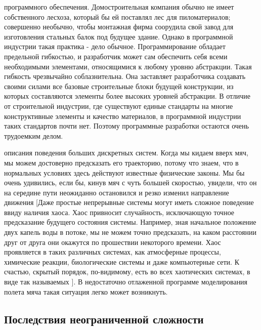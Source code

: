 \documentclass[11pt]{article}
\begin{document}
{ программного обеспечения.} Домостроительная компания обычно не имеет собственного лесхоза, который бы ей поставлял лес для пиломатериалов; совершенно необычно, чтобы монтажная фирма соорудила свой завод для изготовления стальных балок под будущее здание. Однако в программной индустрии такая практика - дело обычное. Программирование обладает предельной гибкостью, и разработчик может сам обеспечить себя всеми необходимыми элементами, относящимися к любому уровню абстракции. Такая гибкость чрезвычайно соблазнительна. Она заставляет разработчика создавать своими силами все базовые строительные блоки будущей конструкции, из которых составляются элементы более высоких уровней абстракции. В отличие от строительной индустрии, где существуют единые стандарты на многие конструктивные элементы и качество материалов, в программной индустрии таких стандартов почти нет. Поэтому программные разработки остаются очень трудоемким делом.
\par
{ описания поведения больших дискретных систем.} Когда мы кидаем вверх мяч, мы можем достоверно предсказать его траекторию, потому что знаем, что в нормальных условиях здесь действуют известные физические законы. Мы бы очень удивились, если бы, кинув мяч с чуть большей скоростью, увидели, что он на середине пути неожиданно остановился и резко изменил направление движения [Даже простые непрерывные системы могут иметь сложное поведение ввиду наличия хаоса. Хаос привносит случайность, исключающую точное предсказание будущего состояния системы. Например, зная начальное положение двух капель воды в потоке, мы не можем точно предсказать, на каком расстоянии друг от друга они окажутся по прошествии некоторого времени. Хаос проявляется в таких различных системах, как атмосферные процессы, химические реакции, биологические системы и даже компьютерные сети. К счастью, скрытый порядок, по-видимому, есть во всех хаотических системах, в виде так называемых {}]. В недостаточно отлаженной программе моделирования полета мяча такая ситуация легко может возникнуть.
\parskip=0pt
\subsection{Последствия неограниченной сложности}
\
\end{document}
